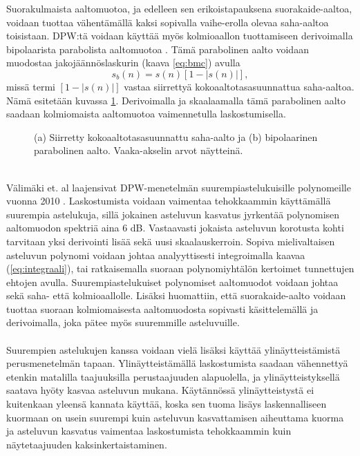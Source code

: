 \documentclass[finnish,12pt,a4paper,pdftex]{article} %
\begin{document}
Suorakulmaista aaltomuotoa, ja edelleen sen erikoistapauksena suorakaide-aaltoa, voidaan tuottaa vähentämällä kaksi sopivalla vaihe-erolla olevaa saha-aaltoa toisistaan. DPW:tä voidaan käyttää myös kolmioaallon tuottamiseen derivoimalla bipolaarista parabolista aaltomuotoa \cite{Valimaki2006}. Tämä parabolinen aalto voidaan muodostaa jakojäännöslaskurin (kaava \ref{eq:bmc}) avulla
\begin{equation}
s_b(n) = s(n)[1-|s(n)|],
\end{equation}
missä termi $[1-|s(n)|]$ vastaa siirrettyä kokoaaltotasasuunnattua saha-aaltoa. Nämä esitetään kuvassa \ref{fig:kaksi}. Derivoimalla ja skaalaamalla tämä parabolinen aalto saadaan kolmiomaista aaltomuotoa vaimennetulla laskostumisella. \cite{Valimaki2010}
\vspace{2mm}
\begin{figure}[h] 
\begin{center}
\caption{(a) Siirretty kokoaaltotasasuunnattu saha-aalto ja (b) bipolaarinen parabolinen aalto. Vaaka-akselin arvot näytteinä.}
\label{fig:kaksi}
\end{center}
\end{figure} \\
Välimäki et. al laajensivat DPW-menetelmän suurempiastelukuisille polynomeille vuonna 2010 \cite{Valimaki2010}. Laskostumista voidaan vaimentaa tehokkaammin käyttämällä suurempia astelukuja, sillä jokainen asteluvun kasvatus jyrkentää polynomisen aaltomuodon spektriä aina 6 dB. Vastaavasti jokaista asteluvun korotusta kohti tarvitaan yksi derivointi lisää sekä uusi skaalauskerroin. Sopiva mielivaltaisen asteluvun polynomi voidaan johtaa analyyttisesti integroimalla kaavaa (\ref{eq:integraali}), tai ratkaisemalla suoraan polynomiyhtälön kertoimet tunnettujen ehtojen avulla. Suurempiastelukuiset polynomiset aaltomuodot voidaan johtaa sekä saha- että kolmioaallolle. Lisäksi huomattiin, että suorakaide-aalto voidaan tuottaa suoraan kolmiomaisesta aaltomuodosta sopivasti käsittelemällä ja derivoimalla, joka pätee myös suuremmille asteluvuille. \cite{Valimaki2010, Kleimola2013} \\\\
Suurempien astelukujen kanssa voidaan vielä lisäksi käyttää ylinäytteistämistä perusmenetelmän tapaan. Ylinäytteistämällä laskostumista saadaan vähennettyä etenkin matalilla taajuuksilla perustaajuuden alapuolella, ja ylinäytteistyksellä saatava hyöty kasvaa asteluvun mukana. Käytännössä ylinäytteistystä ei kuitenkaan yleensä kannata käyttää, koska sen tuoma lisäys laskennalliseen kuormaan on usein suurempi kuin asteluvun kasvattamisen aiheuttama kuorma ja asteluvun kasvatus vaimentaa laskostumista tehokkaammin kuin näytetaajuuden kaksinkertaistaminen. \cite{Valimaki2010} \\\\
\end{document}
